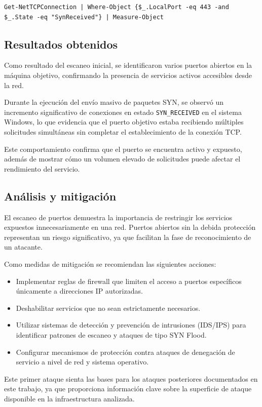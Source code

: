 \begin{lstlisting}[caption={Conteo de conexiones SYN\_RECEIVED}]
Get-NetTCPConnection | Where-Object {$_.LocalPort -eq 443 -and $_.State -eq "SynReceived"} | Measure-Object
\end{lstlisting}

\subsection{Resultados obtenidos}

Como resultado del escaneo inicial, se identificaron varios puertos abiertos en la máquina objetivo, confirmando la presencia de servicios activos accesibles desde la red.

Durante la ejecución del envío masivo de paquetes SYN, se observó un incremento significativo de conexiones en estado \texttt{SYN\_RECEIVED} en el sistema Windows, lo que evidencia que el puerto objetivo estaba recibiendo múltiples solicitudes simultáneas sin completar el establecimiento de la conexión TCP.

Este comportamiento confirma que el puerto se encuentra activo y expuesto, además de mostrar cómo un volumen elevado de solicitudes puede afectar el rendimiento del servicio.

\subsection{Análisis y mitigación}

El escaneo de puertos demuestra la importancia de restringir los servicios expuestos innecesariamente en una red. Puertos abiertos sin la debida protección representan un riesgo significativo, ya que facilitan la fase de reconocimiento de un atacante.

Como medidas de mitigación se recomiendan las siguientes acciones:

\begin{itemize}
    \item Implementar reglas de firewall que limiten el acceso a puertos específicos únicamente a direcciones IP autorizadas.
    \item Deshabilitar servicios que no sean estrictamente necesarios.
    \item Utilizar sistemas de detección y prevención de intrusiones (IDS/IPS) para identificar patrones de escaneo y ataques de tipo SYN Flood.
    \item Configurar mecanismos de protección contra ataques de denegación de servicio a nivel de red y sistema operativo.
\end{itemize}

Este primer ataque sienta las bases para los ataques posteriores documentados en este trabajo, ya que proporciona información clave sobre la superficie de ataque disponible en la infraestructura analizada.

